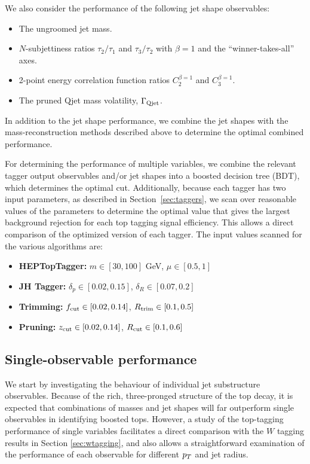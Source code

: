 We also consider the performance of the following jet shape observables:
\begin{itemize}
\item The ungroomed jet mass.
\item $N$-subjettiness ratios $\tau_2 / \tau_1$ and $\tau_3/\tau_2$ with $\beta=1$ and the ``winner-takes-all'' axes.
\item 2-point energy correlation function ratios $C_2^{\beta=1}$ and $C_3^{\beta=1}$.
\item The pruned Qjet mass volatility, $\Gamma_{\rm Qjet}$.
\end{itemize}

\noindent
In addition to the jet shape performance, we combine the jet shapes with the mass-reconstruction methods described above to determine the optimal combined performance.

For determining the performance of multiple variables, we combine the relevant tagger output observables and/or jet shapes into a boosted decision tree (BDT), which determines the optimal cut. Additionally, because each tagger has two input parameters, as described in Section~\ref{sec:taggers}, we scan over reasonable values of the parameters to determine the optimal value that gives the largest background rejection for each top tagging signal efficiency. This allows a direct comparison of the optimized version of each tagger. The input values scanned for the various algorithms are:
%
\begin{itemize}
\item {\bf HEPTopTagger:} $m\in[30,100]$ GeV, $\mu\in[0.5,1]$
\item {\bf JH Tagger:} $\delta_p\in[0.02,0.15]$, $\delta_R\in[0.07,0.2]$
\item {\bf Trimming:} $f_{\rm cut}\in[0.02,0.14]$, $R_{\rm trim}\in[0.1,0.5]$
\item {\bf Pruning:} $z_{\rm cut}\in[0.02,0.14]$, $R_{\rm cut}\in[0.1,0.6]$
\end{itemize}

\subsection{Single-observable performance}\label{sec:single_variable}
We start by investigating the behaviour of individual jet substructure observables. Because of the rich, three-pronged structure of the top decay, it is expected that combinations of masses and jet shapes will far outperform single observables in identifying boosted tops. However, a study of the top-tagging performance of single variables facilitates a direct comparison with the $W$ tagging results in Section \ref{sec:wtagging}, and also allows a straightforward examination of the performance of each observable for different $p_T$ and jet radius.

